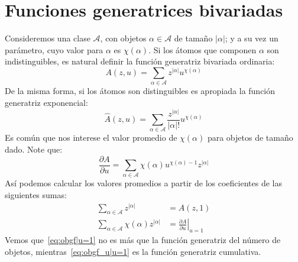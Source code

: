 \section{Funciones generatrices bivariadas}
\label{sec:gf-bivariada}

  Consideremos una clase \(\mathscr{A}\),
  con objetos \(\alpha \in \mathscr{A}\) de tamaño \(\lvert \alpha \rvert\);
  y a su vez un parámetro,
  cuyo valor para \(\alpha\) es \(\chi(\alpha)\).
  Si los átomos que componen \(\alpha\) son indistinguibles,
  es natural definir la función generatriz bivariada ordinaria:
  \begin{equation}
    \label{eq:obgf-def}
    A(z, u)
      = \sum_{\alpha \in \mathscr{A}} z^{\lvert \alpha \rvert} u^{\chi(\alpha)}
  \end{equation}
  De la misma forma,
  si los átomos son distinguibles
  es apropiada la función generatriz exponencial:
  \begin{equation}
    \label{eq:ebgf-def}
    \widehat{A}(z, u)
      = \sum_{\alpha \in \mathscr{A}}
          \frac{z^{\lvert \alpha \rvert}}{\lvert \alpha \rvert !}
             u^{\chi(\alpha)}
  \end{equation}
  Es común que nos interese el valor promedio de \(\chi(\alpha)\)
  para objetos de tamaño dado.
  Note que:
  \begin{equation}
    \label{eq:obgf-partial}
    \frac{\partial A}{\partial u}
      = \sum_{\alpha \in \mathscr{A}}
          \chi(\alpha) u^{\chi(\alpha) - 1} z^{\lvert \alpha \rvert}
  \end{equation}
  Así podemos calcular los valores promedios a partir de
  los coeficientes de las siguientes sumas:
  \begin{align}
    \sum_{\alpha \in \mathscr{A}} z^{\lvert \alpha \rvert}
      &= A(z, 1)
          \label{eq:obgf|u=1} \\
    \sum_{\alpha \in \mathscr{A}} \chi(\alpha) z^{\lvert \alpha \rvert}
      &= \left. \frac{\partial A}{\partial u} \right\rvert_{u = 1}
          \label{eq:obgf_u|u=1}
  \end{align}
  Vemos que~\eqref{eq:obgf|u=1}
  no es más que la función generatriz del número de objetos,
  mientras~\eqref{eq:obgf_u|u=1}
  es la función generatriz cumulativa.




